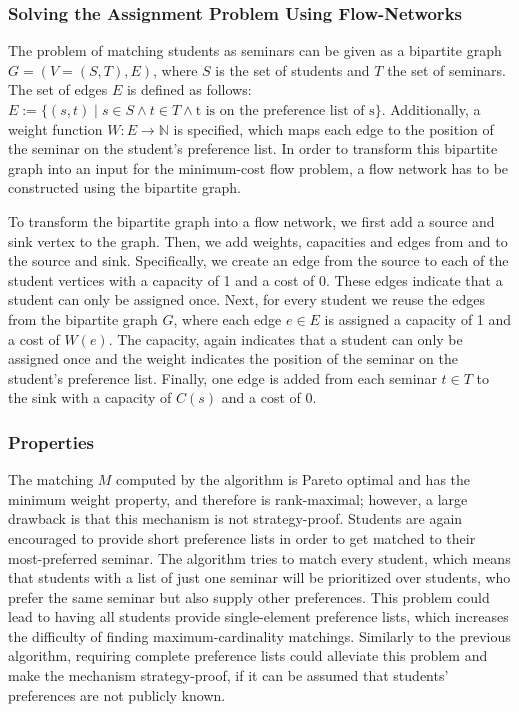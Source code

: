 \subsubsection{Solving the Assignment Problem Using Flow-Networks}
The problem of matching students as seminars can be given as a bipartite graph $G=(V=(S, T), E)$, where $S$ is the set of students and $T$ the set of seminars. The set of edges $E$ is defined as follows: $E:= \{(s, t) \mid s \in S \land t \in T \land \mbox{t is on the preference list of s}\}$. Additionally, a weight function $W: E \rightarrow  \mathbb{N}$ is specified, which maps each edge to the position of the seminar on the student's preference list. In order to transform this bipartite graph into an input for the minimum-cost flow problem, a flow network has to be constructed using the bipartite graph.

To transform the bipartite graph into a flow network, we first add a source and sink vertex to the graph. Then, we add weights, capacities and edges from and to the source and sink. Specifically, we create an edge from the source to each of the student vertices with a capacity of 1 and a cost of 0. These edges indicate that a student can only be assigned once. Next, for every student we reuse the edges from the bipartite graph $G$, where each edge $e \in E$ is assigned a capacity of 1 and a cost of $W(e)$. The capacity, again indicates that a student can only be assigned once and the weight indicates the position of the seminar on the student's preference list. Finally, one edge is added from each seminar $t \in T$ to the sink with a capacity of $C(s)$ and a cost of 0. 

\subsubsection{Properties}
The matching $M$ computed by the algorithm is Pareto optimal \cite{SngThesis} and has the minimum weight property, and therefore is rank-maximal;\cite{SngThesis} however, a large drawback is that this mechanism is not strategy-proof. Students are again encouraged to provide short preference lists in order to get matched to their most-preferred seminar. The algorithm tries to match every student, which means that students with a list of just one seminar will be prioritized over students, who prefer the same seminar but also supply other preferences. This problem could lead to having all students provide single-element preference lists, which increases the difficulty of finding maximum-cardinality matchings. Similarly to the previous algorithm, requiring complete preference lists could alleviate this problem and make the mechanism strategy-proof, if it can be assumed that students' preferences are not publicly known.

